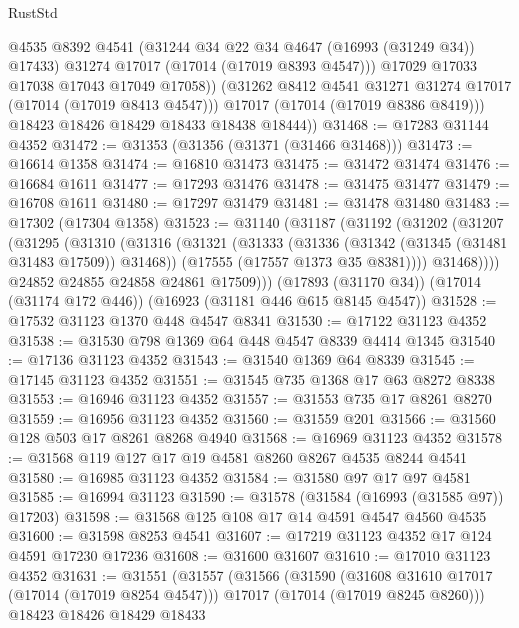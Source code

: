 \begin{lexlean}{RustStd}
\begin{coremodule}
                @4535
                @8392
                @4541
                (@31244 @34 @22 @34 @4647 (@16993 (@31249 @34)) @17433)
                @31274
                @17017
                (@17014 (@17019 @8393 @4547)))
              @17029
              @17033
              @17038
              @17043
              @17049
              @17058))
          (@31262 @8412 @4541 @31271 @31274 @17017 (@17014 (@17019 @8413 @4547)))
          @17017
          (@17014 (@17019 @8386 @8419)))
        @18423
        @18426
        @18429
        @18433
        @18438
        @18444))
@31468 := @17283 @31144 @4352
@31472 := @31353 (@31356 (@31371 (@31466 @31468)))
@31473 := @16614 @1358
@31474 := @16810 @31473
@31475 := @31472 @31474
@31476 := @16684 @1611
@31477 := @17293 @31476
@31478 := @31475 @31477
@31479 := @16708 @1611
@31480 := @17297 @31479
@31481 := @31478 @31480
@31483 := @17302 (@17304 @1358)
@31523 := @31140
    (@31187
      (@31192
        (@31202
          (@31207
            (@31295
              (@31310
                (@31316
                  (@31321
                    (@31333
                      (@31336 (@31342 (@31345 (@31481 @31483 @17509)) @31468))
                      (@17555 (@17557 @1373 @35 @8381))))
                  @31468))))
          @24852
          @24855
          @24858
          @24861
          @17509)))
    (@17893 (@31170 @34))
    (@17014 (@31174 @172 @446))
    (@16923 (@31181 @446 @615 @8145 @4547))
@31528 := @17532 @31123 @1370 @448 @4547 @8341
@31530 := @17122 @31123 @4352
@31538 := @31530 @798 @1369 @64 @448 @4547 @8339 @4414 @1345
@31540 := @17136 @31123 @4352
@31543 := @31540 @1369 @64 @8339
@31545 := @17145 @31123 @4352
@31551 := @31545 @735 @1368 @17 @63 @8272 @8338
@31553 := @16946 @31123 @4352
@31557 := @31553 @735 @17 @8261 @8270
@31559 := @16956 @31123 @4352
@31560 := @31559 @201
@31566 := @31560 @128 @503 @17 @8261 @8268 @4940
@31568 := @16969 @31123 @4352
@31578 := @31568 @119 @127 @17 @19 @4581 @8260 @8267 @4535 @8244 @4541
@31580 := @16985 @31123 @4352
@31584 := @31580 @97 @17 @97 @4581
@31585 := @16994 @31123
@31590 := @31578 (@31584 (@16993 (@31585 @97)) @17203)
@31598 := @31568 @125 @108 @17 @14 @4591 @4547 @4560 @4535
@31600 := @31598 @8253 @4541
@31607 := @17219 @31123 @4352 @17 @124 @4591 @17230 @17236
@31608 := @31600 @31607
@31610 := @17010 @31123 @4352
@31631 := @31551
    (@31557
      (@31566
        (@31590
          (@31608 @31610 @17017 (@17014 (@17019 @8254 @4547)))
          @17017
          (@17014 (@17019 @8245 @8260)))
        @18423
        @18426
        @18429
        @18433

\end{coremodule}
\end{lexlean}
